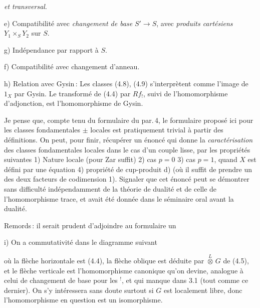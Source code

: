 \documentclass[11pt,a4paper]{article}
\begin{document}
\emph{et transversal}.

e) Compatibilité avec \emph{changement de base} $S' \to S$, avec
\emph{produits cartésiens} $Y_1 \times_S Y_2$ sur $S$.

g) Indépendance par rapport à $S$. 

f) Compatibilité avec changement d'anneau.

h) Relation avec Gysin\,: Les classes (4.8), (4.9) s'interprètent comme
l'image de $1_X$ par Gysin. Le transformé de (4.4) par $Rf_{!}$, suivi de
l'homomorphisme d'adjonction, est l'homomorphisme de Gysin.

Je pense que, compte tenu du formulaire du par.\,4, le formulaire proposé
ici pour les classes fondamentales $\pm$ locales est pratiquement trivial à
partir des définitions. On peut, pour finir, récupérer un énoncé qui donne
la \emph{caractérisation} des classes fondamentales locales dans le cas d'un
couple lisse, par les propriétés suivantes 1) Nature locale (pour Zar
suffit) 2) cas $p = 0$ 3) cas $p = 1$, quand $X$ est défini par une
équation 4) propriété de cup-produit d) (où il suffit de prendre un des
deux facteurs de codimension 1). Signaler  que cet énoncé
 peut se
démontrer sans difficulté indépendamment de la théorie de dualité et de
celle de l'homomorphisme trace, et avait été donnée dans le séminaire oral
avant la dualité.

Remords\,: il serait prudent d'adjoindre au formulaire un

i) On a commutativité dans le diagramme suivant


où la flèche horizontale est (4.4), la flèche oblique est
déduite par $\overset{L}{\otimes}\, G$ de (4.5), et le flèche verticale est
l'homomorphisme canonique qu'on devine, analogue à celui de changement de
base pour les ${}^{!}$, et qui manque dans 3.1 (tout comme ce dernier). On
s'y intéressera sans doute surtout si $G$ est localement libre, donc
l'homomorphisme en question est un isomorphisme.
\end{document}
